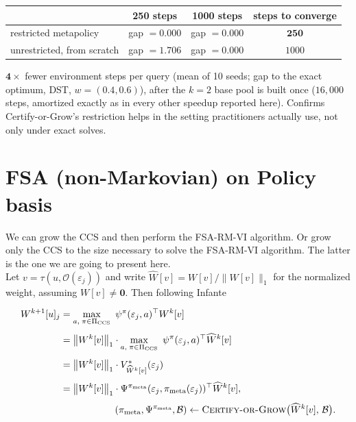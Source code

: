 \documentclass[11pt]{article}
\begin{document}
\begin{center}
\begin{tabular}{lccc}
\toprule
 & 250 steps & 1000 steps & steps to converge \\
\midrule
restricted metapolicy & gap $=0.000$ & gap $=0.000$ & $\mathbf{250}$ \\
unrestricted, from scratch & gap $=1.706$ & gap $=0.000$ & $1000$ \\
\bottomrule
\end{tabular}
\end{center}
$\mathbf{4\times}$ fewer environment steps per query (mean of 10 seeds; gap to the exact optimum, DST, $w=(0.4,0.6)$),
after the $k=2$ base pool is built once ($16{,}000$ steps, amortized exactly as in every other speedup reported here).
Confirms Certify-or-Grow's restriction helps in the setting practitioners actually use, not only under exact solves.

\section{FSA (non-Markovian) on Policy basis}

We can grow the CCS and then perform the FSA-RM-VI algorithm. Or grow only the CCS to the size necessary to solve the FSA-RM-VI algorithm. The latter is the one we are going to present here.
\\


Let $v=\tau(u,\mathcal{O}(\varepsilon_j))$ and write $\widehat{W}[v] = W[v]/\|W[v]\|_1$ for
the normalized weight, assuming $W[v]\neq\mathbf{0}$. Then following Infante

\begin{align}
W^{k+1}[u]_j
&= \max_{a,\;\pi\in\Pi_{\mathrm{CCS}}}\ \psi^{\pi}(\varepsilon_j,a)^{\top}W^{k}[v]
\label{eq:infante11}\\[4pt]
&= \big\|W^{k}[v]\big\|_1 \cdot
   \max_{a,\;\pi\in\Pi_{\mathrm{CCS}}}\ \psi^{\pi}(\varepsilon_j,a)^{\top}\widehat{W}^{k}[v]
\label{eq:homog}\\[4pt]
&= \big\|W^{k}[v]\big\|_1 \cdot V^{*}_{\widehat{W}^{k}[v]}(\varepsilon_j)
\label{eq:gpi}\\[4pt]
&= \big\|W^{k}[v]\big\|_1 \cdot \Psi^{\pi_{\mathrm{meta}}}(\varepsilon_j,\pi_{\mathrm{meta}}(\varepsilon_j))^\top\widehat W^{k}[v],
\label{eq:cog}\\[4pt]
&\hspace{2cm}(\pi_{\mathrm{meta}},\Psi^{\pi_{\mathrm{meta}}},\mathcal{B}) \gets \textsc{Certify-or-Grow}\big(\widehat{W}^{k}[v],\,\mathcal{B}\big).\notag
\end{align}
\end{document}
